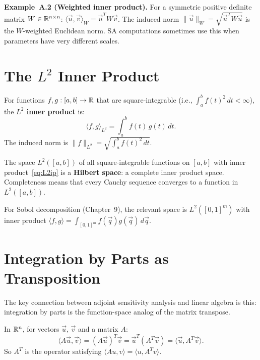 \noindent\textbf{Example~A.2 (Weighted inner product).}
For a symmetric positive definite matrix $W \in \mathbb{R}^{n\times n}$:
$\langle \vec{u}, \vec{v}\rangle_W = \vec{u}^T W \vec{v}$.
The induced norm $\|\vec{u}\|_W = \sqrt{\vec{u}^T W \vec{u}}$ is the
$W$-weighted Euclidean norm. SA computations sometimes use this when
parameters have very different scales.

\section{The $L^2$ Inner Product}
\label{appsec:L2}

For functions $f, g : [a,b] \to \mathbb{R}$ that are square-integrable
(i.e., $\int_a^b f(t)^2\,dt < \infty$), the \textbf{$L^2$ inner product} is:
\begin{equation}
  \langle f, g \rangle_{L^2} = \int_a^b f(t)\,g(t)\,dt.
  \label{eq:L2ip}
\end{equation}
The induced norm is $\|f\|_{L^2} = \sqrt{\int_a^b f(t)^2\,dt}$.

The space $L^2([a,b])$ of all square-integrable functions on $[a,b]$
with inner product~\eqref{eq:L2ip} is a \textbf{Hilbert space}:
a complete inner product space.
Completeness means that every Cauchy sequence converges to a function
in $L^2([a,b])$.

For Sobol decomposition (Chapter~9), the relevant space is $L^2([0,1]^m)$
with inner product $\langle f, g\rangle = \int_{[0,1]^m} f(\vec{q})g(\vec{q})\,d\vec{q}$.

\section{Integration by Parts as Transposition}
\label{appsec:IBP}

The key connection between adjoint sensitivity analysis and linear algebra
is this: integration by parts is the function-space analog of the
matrix transpose.

In $\mathbb{R}^n$, for vectors $\vec{u}$, $\vec{v}$ and a matrix $A$:
\[
  \langle A\vec{u}, \vec{v}\rangle = (A\vec{u})^T\vec{v} = \vec{u}^T(A^T\vec{v})
  = \langle\vec{u}, A^T\vec{v}\rangle.
\]
So $A^T$ is the operator satisfying $\langle Au, v\rangle = \langle u, A^Tv\rangle$.

